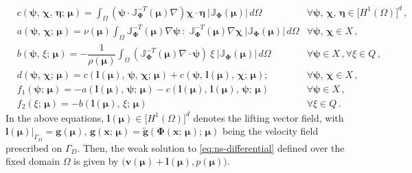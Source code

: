 \documentclass[12pt, a4paper, twoside, openright, notitlepage]{report}
\numberwithin{equation}{chapter}
\theoremstyle{theorem}
\theoremstyle{definition}
\theoremstyle{remark}
\theoremstyle{proposition}
\numberwithin{figure}{chapter}
\newcommand{\wt}[1]{\widetilde{#1}}
\newcommand{\bg}[1]{\boldsymbol{#1}}
\begin{document}
		\begin{subequations}
			\label{eq:ns-weak-forms}
			\begin{align}
				\label{eq:ns-weak-forms-c-reference}
				& c(\bg{\psi}, \, \bg{\chi}, \, \bg{\eta}; \, \bg{\mu}) = \int_{\Omega} \left( \bg{\psi} \cdot \mathbb{J}^{-T}_{\bg{\Phi}}(\bg{\mu}) \nabla \right) \bg{\chi} \cdot \bg{\eta} ~ \lvert \mathbb{J}_{\bg{\Phi}}(\bg{\mu}) \rvert \, d \Omega & \forall \bg{\psi}, \, \bg{\chi}, \, \bg{\eta} \in \big[ H^1(\Omega) \big]^d \, , \\[0.1cm]
				\label{eq:ns-weak-forms-a-reference}
				& a(\bg{\psi}, \, \bg{\chi}; \, \bg{\mu}) = \nu(\bg{\mu}) \int_{\Omega} \mathbb{J}^{-T}_{\bg{\Phi}}(\bg{\mu}) \nabla \bg{\psi} ~ : ~ \mathbb{J}^{-T}_{\bg{\Phi}}(\bg{\mu}) \nabla \bg{\chi} ~ \lvert \mathbb{J}_{\bg{\Phi}}(\bg{\mu}) \rvert \, d \Omega & \forall \bg{\psi}, \, \bg{\chi} \in X \, , \\[0.1cm]
				\label{eq:ns-weak-forms-b-reference}
				& b(\bg{\psi}, \, \xi; \, \bg{\mu}) = - \dfrac{1}{\rho(\bg{\mu})} \int_{\Omega} \left( \mathbb{J}^{-T}_{\bg{\Phi}}(\bg{\mu}) \nabla \cdot \bg{\psi} \right) ~ \xi ~ \lvert \mathbb{J}_{\bg{\Phi}}(\bg{\mu}) \rvert \, d \Omega & \forall \bg{\psi} \in X \, , \forall \xi \in Q \, , \\[0.1cm]
				\label{eq:ns-weak-forms-d-reference}
				& d(\bg{\psi}, \, \bg{\chi}; \, \bg{\mu}) = c(\bg{l}(\bg{\mu}), \, \bg{\psi}, \, \bg{\chi}; \, \bg{\mu}) + c(\bg{\psi}, \, \bg{l}(\bg{\mu}), \, \bg{\chi}; \, \bg{\mu}); & \forall \bg{\psi}, \, \bg{\chi} \in X \, , \\[0.1cm]
				\label{eq:ns-weak-forms-f1-reference}
				& f_1(\bg{\psi}; \, \bg{\mu}) = - a(\bg{l}(\bg{\mu}), \, \bg{\psi}; \, \bg{\mu}) - c(\bg{l}(\bg{\mu}), \, \bg{l}(\bg{\mu}), \, \bg{\psi}; \, \bg{\mu}) & \forall \bg{\psi} \in X \, , \\[0.2cm]
				\label{eq:ns-weak-forms-f2-reference}
				& f_2(\xi; \, \bg{\mu}) = - b(\bg{l}(\bg{\mu}), \, \xi; \, \bg{\mu}) & \forall \xi \in Q \, .
			\end{align}
		\end{subequations}
		In the above equations, $\bg{l}(\bg{\mu}) \in \big[ H^1(\Omega) \big]^d$ denotes the lifting vector field, with $\bg{l}(\bg{\mu}) \big\rvert_{\Gamma_D} = \bg{g}(\bg{\mu})$, $\bg{g}(\bg{x}; \, \bg{\mu}) = \wt{\bg{g}}(\bg{\Phi}(\bg{x}; \, \bg{\mu}); \, \bg{\mu})$ being the velocity field prescribed on $\Gamma_D$. Then, the weak solution to \eqref{eq:ns-differential} defined over the fixed domain $\Omega$ is given by $\big( \bg{v}(\bg{\mu}) + \bg{l}(\bg{\mu}), p(\bg{\mu}) \big)$.
		
\end{document}
